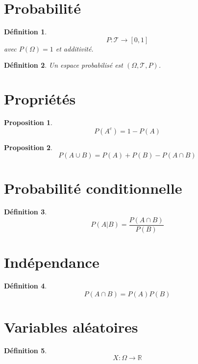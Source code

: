 \documentclass[11pt,a4paper]{article}
\newtheorem{definition}{Définition}
\newtheorem{proposition}{Proposition}
\begin{document}
\section{Probabilité}

\begin{definition}
\[
P : \mathcal{T} \to [0,1]
\]
avec $P(\Omega)=1$ et additivité.
\end{definition}

\begin{definition}
Un espace probabilisé est $(\Omega,\mathcal{T},P)$.
\end{definition}

\section{Propriétés}

\begin{proposition}
\[
P(A^c)=1-P(A)
\]
\end{proposition}

\begin{proposition}
\[
P(A \cup B)=P(A)+P(B)-P(A \cap B)
\]
\end{proposition}

\section{Probabilité conditionnelle}

\begin{definition}
\[
P(A|B)=\frac{P(A \cap B)}{P(B)}
\]
\end{definition}

\section{Indépendance}

\begin{definition}
\[
P(A \cap B)=P(A)P(B)
\]
\end{definition}

\section{Variables aléatoires}

\begin{definition}
\[
X : \Omega \to \mathbb{R}
\]
\end{definition}
\end{document}
